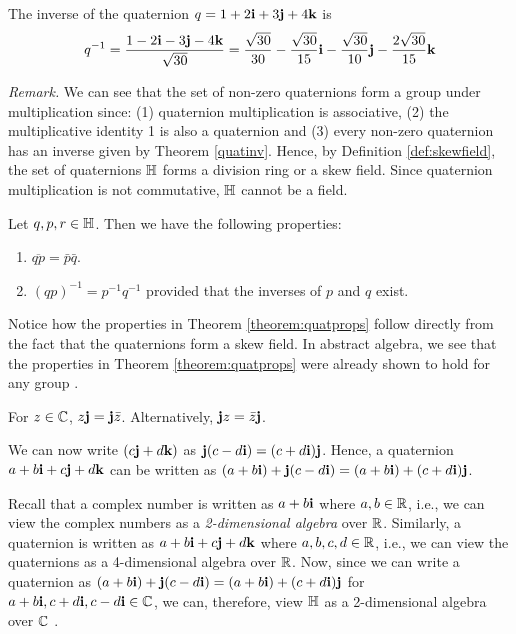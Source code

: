 \begin{ex}
	The inverse of the quaternion $q = 1+2\textbf{i}+3\textbf{j}+4\textbf{k}$ is $$q^{-1} = \frac{1-2\textbf{i}-3\textbf{j}-4\textbf{k}}{\sqrt{30}} = \frac{\sqrt{30}}{30} - \frac{\sqrt{30}}{15}\textbf{i} - \frac{\sqrt{30}}{10}\textbf{j} - \frac{2\sqrt{30}}{15}\textbf{k}$$
\end{ex}

\textit{Remark.} We can see that the set of non-zero quaternions form a group under multiplication since: (1) quaternion multiplication is associative, (2) the multiplicative identity 1 is also a quaternion and (3) every non-zero quaternion has an inverse given by Theorem \ref{quatinv}. Hence, by Definition \ref{def:skewfield}, the set of quaternions $\operatorname{\mathbb{H}}$ forms a division ring or a skew field. Since quaternion multiplication is not commutative, $\operatorname{\mathbb{H}}$ cannot be a field.

\begin{theorem} \label{theorem:quatprops}
\cite{lerios} Let $q, p, r \in \operatorname{\mathbb{H}}$. Then we have the following properties:
	\begin{enumerate}
		\item $\overline{qp} = \bar{p}\bar{q}$.
		\item $(qp)^{-1} = p^{-1}q^{-1}$ provided that the inverses of $p$ and $q$ exist. 
	\end{enumerate}
\end{theorem}

Notice how the properties in Theorem \ref{theorem:quatprops} follow directly from the fact that the quaternions form a skew field. In abstract algebra, we see that the properties in Theorem \ref{theorem:quatprops} were already shown to hold for any group \cite{fraleigh}.

\begin{theorem} \label{jx}
	\cite{aslaksen} For $z \in \operatorname{\mathbb{C}}$, $z\textbf{j} = \textbf{j}\bar{z}$. Alternatively, $\textbf{j} z = \bar{z}\textbf{j}$. \cite{aslaksen}
\end{theorem}

We can now write $(c\textbf{j}+d\textbf{k})$ as $\textbf{j}(c-d\textbf{i}) = (c+d\textbf{i})\textbf{j}$. Hence, a quaternion $a + b\textbf{i} + c\textbf{j} + d\textbf{k}$ can be written as $(a+b\textbf{i})+\textbf{j}(c-d\textbf{i}) = (a+b\textbf{i})+(c+d\textbf{i})\textbf{j}$. 

Recall that a complex number is written as $a+b\textbf{i}$ where $a,b \in \operatorname{\mathbb{R}}$, i.e., we can view the complex numbers as a \emph{2-dimensional algebra} over $\operatorname{\mathbb{R}}$. Similarly, a quaternion is written as $a + b\textbf{i} + c\textbf{j} + d\textbf{k}$ where $a,b,c,d \in \operatorname{\mathbb{R}}$, i.e., we can view the quaternions as a 4-dimensional algebra over $\operatorname{\mathbb{R}}$. Now, since we can write a quaternion as $(a+b\textbf{i})+\textbf{j}(c-d\textbf{i}) = (a+b\textbf{i})+(c+d\textbf{i})\textbf{j}$ for $a+b\textbf{i},c+d\textbf{i},c-d\textbf{i} \in \operatorname{\mathbb{C}}$, we can, therefore, view $\operatorname{\mathbb{H}}$ as a 2-dimensional algebra over $\operatorname{\mathbb{C}}$ \cite{stamaria}.

